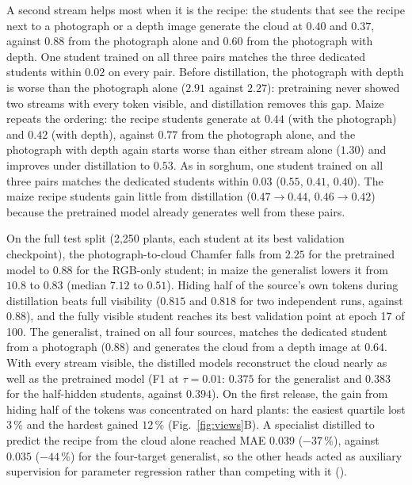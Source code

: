 A second stream helps most when it is the recipe: the students that see the
recipe next to a photograph or a depth image generate the cloud at $0.40$ and
$0.37$, against $0.88$ from the photograph alone and $0.60$ from the photograph
with depth. One student trained on all three pairs matches the three dedicated
students within $0.02$ on every pair. Before distillation, the photograph with
depth is worse than the photograph alone ($2.91$ against $2.27$): pretraining
never showed two streams with every token visible, and distillation removes
this gap. Maize repeats the ordering: the recipe students generate at $0.44$
(with the photograph) and $0.42$ (with depth), against $0.77$ from the
photograph alone, and the photograph with depth again starts worse than either
stream alone ($1.30$) and improves under distillation to $0.53$. As in sorghum,
one student trained on all three pairs matches the dedicated students within
$0.03$ ($0.55$, $0.41$, $0.40$). The maize recipe students gain little from distillation
($0.47 \to 0.44$, $0.46 \to 0.42$) because the pretrained model already
generates well from these pairs.

On the full test split (2{,}250 plants, each student at its best validation
checkpoint), the photograph-to-cloud Chamfer falls from $2.25$ for the
pretrained model to $0.88$ for the RGB-only student; in maize the generalist
lowers it from $10.8$ to $0.83$ (median $7.12$ to $0.51$). Hiding half of the
source's own tokens during distillation beats full visibility ($0.815$ and
$0.818$ for two independent runs, against $0.88$), and the fully visible
student reaches its best validation point at epoch 17 of 100. The generalist,
trained on all four sources, matches the dedicated student from a photograph
($0.88$) and generates the cloud from a depth image at $0.64$. With every
stream visible, the distilled models reconstruct the cloud nearly as well as
the pretrained model (F1 at $\tau{=}0.01$: $0.375$ for the generalist and
$0.383$ for the half-hidden students, against $0.394$).
On the first release, the gain from hiding half of the tokens was concentrated
on hard plants: the easiest quartile lost $3\,\%$ and the hardest gained
$12\,\%$ (Fig.~\ref{fig:views}B). A specialist distilled to predict the recipe
from the cloud alone reached MAE $0.039$ ($-37\,\%$), against $0.035$
($-44\,\%$) for the four-target generalist, so the other heads acted as
auxiliary supervision for parameter regression rather than competing with it
().

